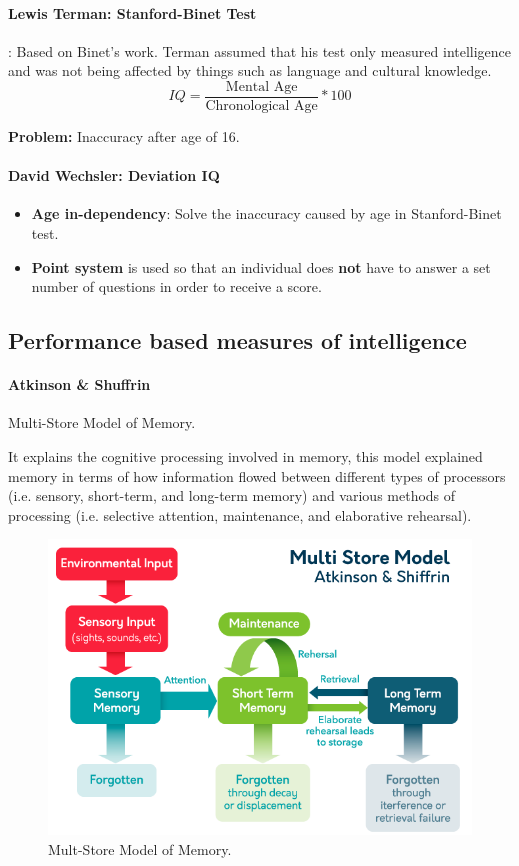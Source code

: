 \documentclass{article}
\begin{document}
	\paragraph{Lewis Terman: Stanford-Binet Test}: Based on Binet's work. Terman assumed that his test only measured intelligence and was not being affected by things such as language and cultural knowledge.
	\[
	IQ = \frac{\text{Mental Age}}{\text{Chronological Age}} * 100
	\]

	\textbf{Problem: } Inaccuracy after age of 16.

	\paragraph{David Wechsler: Deviation IQ}
	\begin{itemize}
		\item \textbf{Age in-dependency}: Solve the inaccuracy caused by age in Stanford-Binet test.
		\item \textbf{Point system} is used so that an individual does \textbf{not} have to answer a set number of questions in order to receive a score.
	\end{itemize}

	\subsection{Performance based measures of intelligence}
	\paragraph{Atkinson \& Shuffrin} Multi-Store Model of Memory.
	
	It explains the cognitive processing involved in memory, this model explained memory in terms of how information flowed between different types of processors (i.e. sensory, short-term, and long-term memory) and various methods of processing (i.e. selective attention, maintenance, and elaborative rehearsal).
	\begin{figure}[H]
		\centering
		\includegraphics[width = \linewidth]{pic/Multi_store_model}
		\caption{Mult-Store Model of Memory.}
	\end{figure}
	
\end{document}
